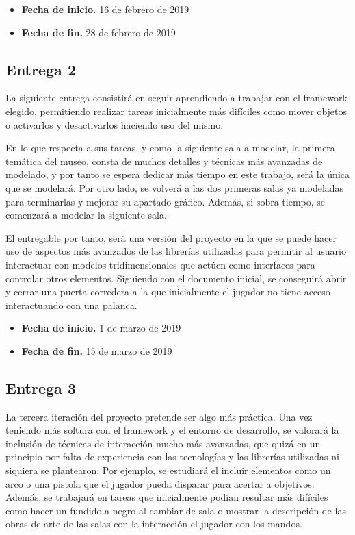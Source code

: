 \begin{itemize}
    \item \textbf{Fecha de inicio.} 16 de febrero de 2019
    \item \textbf{Fecha de fin.} 28 de febrero de 2019
\end{itemize}

\subsection{Entrega 2}

La siguiente entrega consistirá en seguir aprendiendo a trabajar con el framework elegido, permitiendo realizar tareas inicialmente más difíciles como mover objetos o activarlos y desactivarlos haciendo uso del mismo.

En lo que respecta a sus tareas, y como la siguiente sala a modelar, la primera temática del museo, consta de muchos detalles y técnicas más avanzadas de modelado, y por tanto se espera dedicar más tiempo en este trabajo, será la única que se modelará. Por otro lado, se volverá a las dos primeras salas ya modeladas para terminarlas y mejorar su apartado gráfico. Además, si sobra tiempo, se comenzará a modelar la siguiente sala.


El entregable por tanto, será una versión del proyecto en la que se puede hacer uso de aspectos más avanzados de las librerías utilizadas para permitir al usuario interactuar con modelos tridimensionales que actúen como interfaces para controlar otros elementos. Siguiendo con el documento inicial, se conseguirá abrir y cerrar una puerta corredera a la que inicialmente el jugador no tiene acceso interactuando con una palanca.

\begin{itemize}
    \item \textbf{Fecha de inicio.} 1 de marzo de 2019
    \item \textbf{Fecha de fin.} 15 de marzo de 2019
\end{itemize}

\subsection{Entrega 3}

La tercera iteración del proyecto pretende ser algo más práctica. Una vez teniendo más soltura con el framework y el entorno de desarrollo, se valorará la inclusión de técnicas de interacción mucho más avanzadas, que quizá en un principio por falta de experiencia con las tecnologías y las librerías utilizadas ni siquiera se plantearon. Por ejemplo, se estudiará el incluir elementos como un arco o una pistola que el jugador pueda disparar para acertar a objetivos. Además, se trabajará en tareas que inicialmente podían resultar más difíciles como hacer un fundido a negro al cambiar de sala o mostrar la descripción de las obras de arte de las salas con la interacción el jugador con los mandos.

